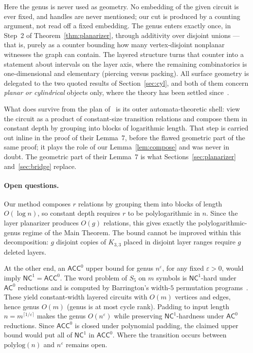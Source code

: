 \documentclass[11pt]{article}
\theoremstyle{definition}
\theoremstyle{remark}
\newcommand{\ACC}{\mathsf{ACC}^0}
\newcommand{\AC}{\mathsf{AC}^0}
\newcommand{\NC}{\mathsf{NC}^1}
\begin{document}
Here the genus is never used as geometry.  No embedding of the given circuit is
ever fixed, and handles are never mentioned; our cut is produced by a counting argument, not read off a
fixed embedding.  The genus enters exactly once, in
Step~2 of Theorem~\ref{thm:planarizer}, through additivity over disjoint unions ---
that is, purely as a counter bounding how many vertex-disjoint nonplanar witnesses
the graph can contain.  The layered structure turns that counter into a statement
about intervals on the layer axis, where the remaining combinatorics is
one-dimensional and elementary (piercing versus packing).  All surface geometry is
delegated to the two quoted results of Section~\ref{sec:cyl}, and both of them
concern \emph{planar or cylindrical} objects only, where the theory has been settled
since~\cite{HMV02,Hansen03}.

What does survive from the plan of~\cite{ADR05} is its outer automata-theoretic
shell: view the circuit as a product of constant-size transition relations and
compose them in constant depth by grouping into blocks of logarithmic length.  That
step is carried out inline in the proof of their Lemma~7, before the flawed
geometric part of the same proof; it plays the role of our
Lemma~\ref{lem:compose} and was never in doubt. The
geometric part of their Lemma~7 is what Sections~\ref{sec:planarizer}
and~\ref{sec:bridge} replace.

\paragraph{Open questions.}\label{sec:open}
Our method composes $r$ relations by grouping them into blocks of length
$O(\log n)$, so constant depth requires $r$ to be polylogarithmic in $n$.  Since
the layer planarizer produces $O(g)$ relations, this gives exactly the
polylogarithmic-genus regime of the Main Theorem.  The bound cannot be improved
within this decomposition: $g$ disjoint copies of $K_{3,3}$ placed in disjoint
layer ranges require $g$ deleted layers.

At the other end, an $\ACC$ upper bound for genus $n^{\varepsilon}$, for any fixed
$\varepsilon>0$, would imply $\NC=\ACC$.  The word problem of $S_5$ on $m$
symbols is $\NC$-hard under $\AC$ reductions and is computed by Barrington's
width-$5$ permutation programs~\cite{Barrington89}.  These yield constant-width
layered circuits with $O(m)$ vertices and edges, hence genus $O(m)$ (genus is at
most cycle rank).  Padding to input length
$n=m^{\lceil1/\varepsilon\rceil}$ makes the genus $O(n^{\varepsilon})$ while
preserving $\NC$-hardness under $\AC$ reductions.  Since $\ACC$ is closed under
polynomial padding, the claimed upper bound would put all of $\NC$ in $\ACC$.
Where the transition occurs between $\mathrm{polylog}(n)$ and $n^{\varepsilon}$
remains open.
\end{document}
